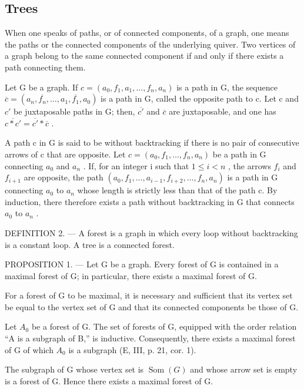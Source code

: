 \subsection{Trees}

When one speaks of paths, or of connected components, of a graph, one means the paths or the connected components of the underlying quiver. Two vertices of a graph belong to the same connected component if and only if there exists a path connecting them.

Let G be a graph. If \(c = (a_{0}, f_{1}, a_{1}, \ldots, f_{n}, a_{n})\) is a path in G, the sequence \(\overline{c} = (a_{n}, \overline{f_{n}}, \ldots, a_{1}, \overline{f_{1}}, a_{0})\) is a path in G, called the opposite path to c. Let c and \(c'\) be juxtaposable paths in G; then, \(\overline{c'}\) and \(\overline{c}\) are juxtaposable, and one has \(\overline{c * c'} = \overline{c'} * \overline{c}\) .

A path c in G is said to be without backtracking if there is no pair of consecutive arrows of c that are opposite. Let \(c = (a_{0}, f_{1}, \ldots, f_{n}, a_{n})\) be a path in G connecting \(a_{0}\) and \(a_{n}\) . If, for an integer i such that \(1 \leqslant i < n\) , the arrows \(f_{i}\) and \(f_{i+1}\) are opposite, the path \((a_{0}, f_{1}, \ldots, a_{i-1}, f_{i+2}, \ldots, f_{n}, a_{n})\) is a path in G connecting \(a_{0}\) to \(a_{n}\) whose length is strictly less than that of the path c. By induction, there therefore exists a path without backtracking in G that connects \(a_{0}\) to \(a_{n}\) .

DEFINITION 2. --- A forest is a graph in which every loop without backtracking is a constant loop. A tree is a connected forest.

PROPOSITION 1. --- Let G be a graph. Every forest of G is contained in a maximal forest of G; in particular, there exists a maximal forest of G.

For a forest of G to be maximal, it is necessary and sufficient that its vertex set be equal to the vertex set of G and that its connected components be those of G.

Let \(A_{0}\) be a forest of G. The set of forests of G, equipped with the order relation “A is a subgraph of B,” is inductive. Consequently, there exists a maximal forest of G of which \(A_{0}\) is a subgraph (E, III, p. 21, cor. 1).

The subgraph of G whose vertex set is \(\operatorname{Som}(G)\) and whose arrow set is empty is a forest of G. Hence there exists a maximal forest of G.

